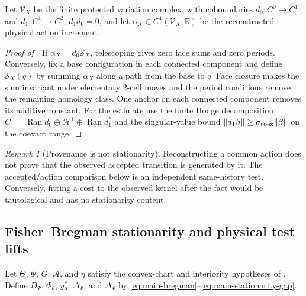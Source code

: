 \documentclass[11pt]{article}
\numberwithin{equation}{section}
\theoremstyle{definition}
\theoremstyle{remark}
\newtheorem{remark}[remark]{Remark}
\newcommand{\R}{\mathbb R}
\newcommand{\Ran}{\operatorname{Ran}}
\begin{document}
Let $\mathscr V_X$ be the finite protected variation complex, with coboundaries
$d_0:C^0\to C^1$ and $d_1:C^1\to C^2$, $d_1d_0=0$, and let
$\alpha_X\in C^1(\mathscr V_X;\R)$ be the reconstructed physical action
increment.


\begin{proof}[Proof of ]
If $\alpha_X=d_0\mathscr S_X$, telescoping gives zero face sums and zero periods.
Conversely, fix a base configuration in each connected component and define $\mathscr S_X(q)$ by summing
$\alpha_X$ along a path from the base to $q$.  Face closure makes the sum
invariant under elementary $2$-cell moves and the period conditions remove the
remaining homology class.  One anchor on each connected component removes its additive constant.  For the
estimate use the finite Hodge decomposition
$C^1=\Ran d_0\oplus\mathcal H^1\oplus\Ran d_1^*$ and the singular-value bound
$\|d_1\beta\|\ge\sigma_{\rm coex}\|\beta\|$ on the coexact range.
\end{proof}

\begin{remark}[Provenance is not stationarity]
Reconstructing a common action does not prove that the observed accepted
transition is generated by it.  The accepted/action comparison below is an
independent same-history test.  Conversely, fitting a cost to the observed
kernel after the fact would be tautological and has no stationarity content.
\end{remark}

\subsection{Fisher--Bregman stationarity and physical test lifts}

Let $\Theta$, $\Psi$, $G$, $\mathcal A$, and $\eta$ satisfy the convex-chart
and interiority hypotheses of .  Define
$D_\Psi$, $\Phi_\theta$, $y_\theta^*$, $\Delta_\Psi$, and
$\overline\Delta_\Psi$ by
\eqref{eq:main-bregman}--\eqref{eq:main-stationarity-gap}.
\end{document}
